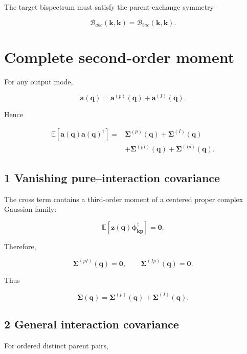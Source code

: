 \documentclass[
  11pt,
  a4paper,
]{article}
\begin{document}
The target bispectrum must satisfy the parent-exchange symmetry

\[
\mathcal B_{abc}(\boldsymbol k,\boldsymbol k)
=
\mathcal B_{bac}(\boldsymbol k,\boldsymbol k).
\]

\section{Complete second-order
moment}\label{complete-second-order-moment}

For any output mode,

\[
\boldsymbol a(\boldsymbol q)
=
\boldsymbol a^{(p)}(\boldsymbol q)
+
\boldsymbol a^{(I)}(\boldsymbol q).
\]

Hence

\[
\begin{aligned}
\mathbb E[
\boldsymbol a(\boldsymbol q)
\boldsymbol a(\boldsymbol q)^\dagger
]
={}&
\boldsymbol\Sigma^{(p)}(\boldsymbol q)
+
\boldsymbol\Sigma^{(I)}(\boldsymbol q)
\\
&+
\boldsymbol\Sigma^{(pI)}(\boldsymbol q)
+
\boldsymbol\Sigma^{(Ip)}(\boldsymbol q).
\end{aligned}
\]

\subsection{1 Vanishing pure--interaction
covariance}\label{vanishing-pureinteraction-covariance}

The cross term contains a third-order moment of a centered proper
complex Gaussian family:

\[
\mathbb E\!\left[
\boldsymbol z(\boldsymbol q)
\boldsymbol\phi_{\boldsymbol k\boldsymbol p}^\dagger
\right]
=
\boldsymbol0.
\]

Therefore,

\[
\boldsymbol\Sigma^{(pI)}(\boldsymbol q)
=
\boldsymbol0,
\qquad
\boldsymbol\Sigma^{(Ip)}(\boldsymbol q)
=
\boldsymbol0.
\]

Thus

\[
\boldsymbol\Sigma(\boldsymbol q)
=
\boldsymbol\Sigma^{(p)}(\boldsymbol q)
+
\boldsymbol\Sigma^{(I)}(\boldsymbol q).
\]

\subsection{2 General interaction
covariance}\label{general-interaction-covariance}

For ordered distinct parent pairs,
\end{document}
